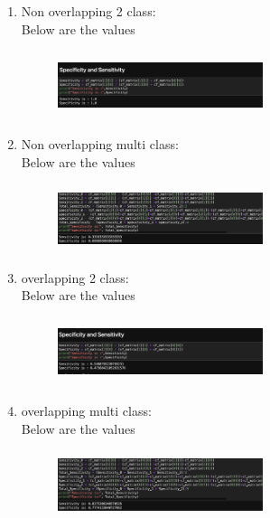 \documentclass[conference]{IEEEtran}
\begin{document}
\begin{enumerate}
    \item 
    Non overlapping 2 class: \\
Below are the values \\
\begin{figure}[!htbp]
    \centering
    \includegraphics[width=6cm, height=2cm]{task2.31.png}
    \label{fig:my_label}
\end{figure}
\item
Non overlapping multi class: \\
Below are the values \\
\begin{figure}[!htbp]
    \centering
    \includegraphics[width=6cm, height=2cm]{task2.32.png}
    \label{fig:my_label}
\end{figure}
\item
overlapping 2 class: \\
Below are the values \\
\begin{figure}[!htbp]
    \centering
    \includegraphics[width=6cm, height=2cm]{task2.33.png}
    \label{fig:my_label}
\end{figure}
\item
overlapping multi class: \\
Below are the values \\
\begin{figure}[!htbp]
    \centering
    \includegraphics[width=6cm, height=2cm]{task2.34.png}
    \label{fig:my_label}
\end{figure}
\end{enumerate}
\end{document}
